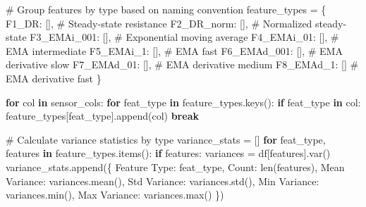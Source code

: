 \documentclass[
  letterpaper,
  DIV=11,
  numbers=noendperiod]{scrartcl}
\newenvironment{Shaded}{\begin{snugshade}}{\end{snugshade}}
\newcommand{\BuiltInTok}[1]{\textcolor[rgb]{0.00,0.23,0.31}{#1}}
\newcommand{\CommentTok}[1]{\textcolor[rgb]{0.37,0.37,0.37}{#1}}
\newcommand{\ControlFlowTok}[1]{\textcolor[rgb]{0.00,0.23,0.31}{\textbf{#1}}}
\newcommand{\KeywordTok}[1]{\textcolor[rgb]{0.00,0.23,0.31}{\textbf{#1}}}
\newcommand{\NormalTok}[1]{\textcolor[rgb]{0.00,0.23,0.31}{#1}}
\newcommand{\OperatorTok}[1]{\textcolor[rgb]{0.37,0.37,0.37}{#1}}
\newcommand{\StringTok}[1]{\textcolor[rgb]{0.13,0.47,0.30}{#1}}
\renewenvironment{Shaded}{%
  \begin{tcolorbox}[%
    enhanced,%
    colback=codebg,%
    colframe=codebg,%
    borderline west={3pt}{0pt}{sectionblue},%
    fontupper=\small\ttfamily,%
    boxrule=0pt,%
    arc=0pt,%
    boxsep=5pt,%
    left=2mm,%
    right=2mm,%
    top=2mm,%
    bottom=2mm%
  ]%
}{%
  \end{tcolorbox}%
}
\begin{document}
\begin{Shaded}
\begin{Highlighting}[]
\CommentTok{\# Group features by type based on naming convention}
\NormalTok{feature\_types }\OperatorTok{=}\NormalTok{ \{}
    \StringTok{\textquotesingle{}F1\_DR\textquotesingle{}}\NormalTok{: [],           }\CommentTok{\# Steady{-}state resistance}
    \StringTok{\textquotesingle{}F2\_DR\_norm\textquotesingle{}}\NormalTok{: [],      }\CommentTok{\# Normalized steady{-}state}
    \StringTok{\textquotesingle{}F3\_EMAi\_001\textquotesingle{}}\NormalTok{: [],     }\CommentTok{\# Exponential moving average}
    \StringTok{\textquotesingle{}F4\_EMAi\_01\textquotesingle{}}\NormalTok{: [],      }\CommentTok{\# EMA intermediate}
    \StringTok{\textquotesingle{}F5\_EMAi\_1\textquotesingle{}}\NormalTok{: [],       }\CommentTok{\# EMA fast}
    \StringTok{\textquotesingle{}F6\_EMAd\_001\textquotesingle{}}\NormalTok{: [],     }\CommentTok{\# EMA derivative slow}
    \StringTok{\textquotesingle{}F7\_EMAd\_01\textquotesingle{}}\NormalTok{: [],      }\CommentTok{\# EMA derivative medium}
    \StringTok{\textquotesingle{}F8\_EMAd\_1\textquotesingle{}}\NormalTok{: []        }\CommentTok{\# EMA derivative fast}
\NormalTok{\}}

\ControlFlowTok{for}\NormalTok{ col }\KeywordTok{in}\NormalTok{ sensor\_cols:}
    \ControlFlowTok{for}\NormalTok{ feat\_type }\KeywordTok{in}\NormalTok{ feature\_types.keys():}
        \ControlFlowTok{if}\NormalTok{ feat\_type }\KeywordTok{in}\NormalTok{ col:}
\NormalTok{            feature\_types[feat\_type].append(col)}
            \ControlFlowTok{break}

\CommentTok{\# Calculate variance statistics by type}
\NormalTok{variance\_stats }\OperatorTok{=}\NormalTok{ []}
\ControlFlowTok{for}\NormalTok{ feat\_type, features }\KeywordTok{in}\NormalTok{ feature\_types.items():}
    \ControlFlowTok{if}\NormalTok{ features:}
\NormalTok{        variances }\OperatorTok{=}\NormalTok{ df[features].var()}
\NormalTok{        variance\_stats.append(\{}
            \StringTok{\textquotesingle{}Feature Type\textquotesingle{}}\NormalTok{: feat\_type,}
            \StringTok{\textquotesingle{}Count\textquotesingle{}}\NormalTok{: }\BuiltInTok{len}\NormalTok{(features),}
            \StringTok{\textquotesingle{}Mean Variance\textquotesingle{}}\NormalTok{: variances.mean(),}
            \StringTok{\textquotesingle{}Std Variance\textquotesingle{}}\NormalTok{: variances.std(),}
            \StringTok{\textquotesingle{}Min Variance\textquotesingle{}}\NormalTok{: variances.}\BuiltInTok{min}\NormalTok{(),}
            \StringTok{\textquotesingle{}Max Variance\textquotesingle{}}\NormalTok{: variances.}\BuiltInTok{max}\NormalTok{()}
\NormalTok{        \})}


\end{Highlighting}
\end{Shaded}
\end{document}
